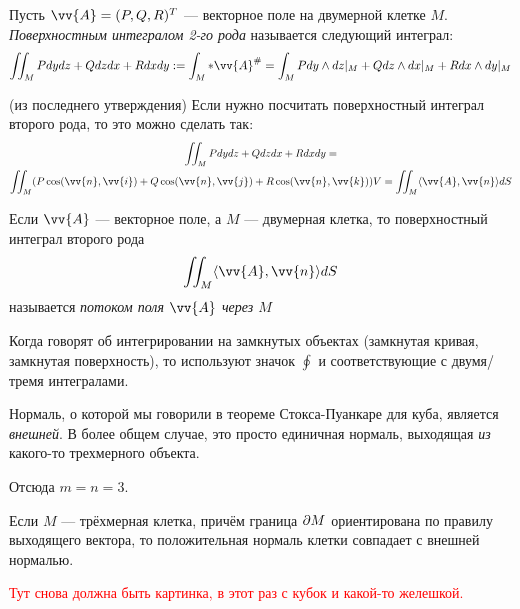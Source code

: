 \begin{definition}
	Пусть $\vv{A} = (P, Q, R)^T$ --- векторное поле на двумерной клетке $M$. \textit{Поверхностным интегралом 2-го рода} называется следующий интеграл:
	\[
	\iint_M Pdydz + Qdzdx + Rdxdy := \int_M *\vv{A}^\# = \int_M Pdy \wedge dz|_M + Q dz \wedge dx|_M + Rdx \wedge dy|_M
	\]
\end{definition}

\begin{corollary} (из последнего утверждения)
	Если нужно посчитать поверхностный интеграл второго рода, то это можно сделать так:
	\begin{multline*}
	\iint_M Pdydz + Qdzdx + Rdxdy =
	\\
	\iint_M (P\cos(\vv{n}, \vv{i}) + Q\cos(\vv{n}, \vv{j}) + R\cos(\vv{n}, \vv{k}))V = \iint_M \ntbr{\vv{A}, \vv{n}}dS
	\end{multline*}
\end{corollary}

\begin{definition}
	Если $\vv{A}$ --- векторное поле, а $M$ --- двумерная клетка, то поверхностный интеграл второго рода
	\[
	\iint_M \ntbr{\vv{A}, \vv{n}}dS
	\]
	называется \textit{потоком поля $\vv{A}$ через $M$}
\end{definition}

\begin{anote}
	Когда говорят об интегрировании на замкнутых объектах (замкнутая кривая, замкнутая поверхность), то используют значок $\oint$ и соответствующие с двумя/тремя интегралами.
\end{anote}

\begin{reminder}
	Нормаль, о которой мы говорили в теореме Стокса-Пуанкаре для куба, является \textit{внешней}. В более общем случае, это просто единичная нормаль, выходящая \textit{из} какого-то трехмерного объекта.
\end{reminder}

\begin{note}
	Отсюда $m = n = 3$.
\end{note}

\begin{lemma}
	Если $M$ --- трёхмерная клетка, причём граница $\partial M$ ориентирована по правилу выходящего вектора, то положительная нормаль клетки совпадает с внешней нормалью.
\end{lemma}

\textcolor{red}{Тут снова должна быть картинка, в этот раз с кубок и какой-то желешкой.}

